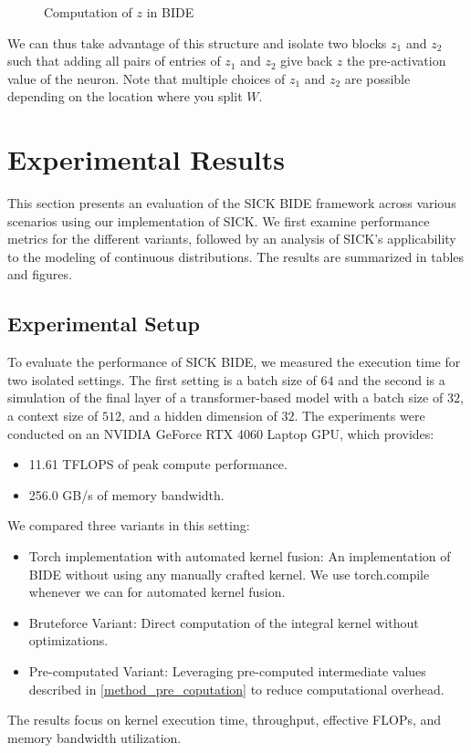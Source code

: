 \documentclass{article}
\begin{document}
\begin{figure}[ht]
    \caption{Computation of $z$ in BIDE}
    \label{fig:z_precomputed}
\end{figure}
We can thus take advantage of this structure and isolate two blocks $z_1$ and $z_2$ such that adding all pairs of entries of $z_1$ and $z_2$ give back $z$ the pre-activation value of the neuron. Note that multiple choices of $z_1$ and $z_2$ are possible depending on the location where you split $W$.

\section{Experimental Results}
This section presents an evaluation of the SICK BIDE framework across various scenarios using our implementation of SICK. 
We first examine performance metrics for the different variants, followed by an analysis of SICK’s applicability to the modeling of continuous distributions. The results are summarized in tables and figures.

\subsection{Experimental Setup}
To evaluate the performance of SICK BIDE, we measured the execution time for two isolated settings. The first setting is a batch size of $64$ and the second is a simulation of the final layer of a transformer-based model with a batch size of $32$, a context size of $512$, and a hidden dimension of $32$.
The experiments were conducted on an NVIDIA GeForce RTX 4060 Laptop GPU, which provides:
\begin{itemize}
\item 11.61 TFLOPS of peak compute performance.
\item 256.0 GB/s of memory bandwidth.
\end{itemize}

We compared three variants in this setting:
\begin{itemize}
\item Torch implementation with automated kernel fusion: An implementation of BIDE without using any manually crafted kernel. We use torch.compile whenever we can for automated kernel fusion.
\item Bruteforce Variant: Direct computation of the integral kernel without optimizations.
\item Pre-computated Variant: Leveraging pre-computed intermediate values described in \ref{method_pre_coputation} to reduce computational overhead.
\end{itemize}
The results focus on kernel execution time, throughput, effective FLOPs, and memory bandwidth utilization.
\end{document}
